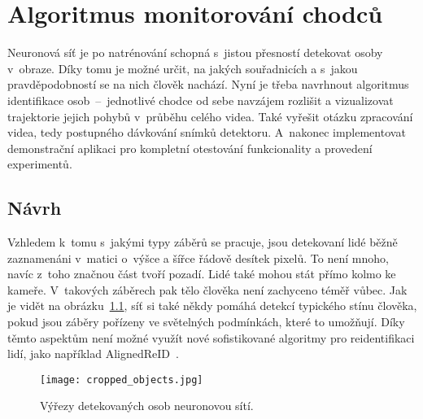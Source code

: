 
\chapter{Algoritmus monitorování chodců}
\label{chap_5}

Neuronová síť je po natrénování schopná s~jistou přesností detekovat osoby v~obraze. Díky tomu je možné určit, na jakých souřadnicích a s~jakou pravděpodobností se na nich člověk nachází. Nyní je třeba navrhnout algoritmus identifikace osob~--~jednotlivé chodce od sebe navzájem rozlišit a vizualizovat trajektorie jejich pohybů v~průběhu celého videa. Také vyřešit otázku zpracování videa, tedy postupného dávkování snímků detektoru. A~nakonec implementovat demonstrační aplikaci pro kompletní otestování funkcionality a provedení experimentů.


\section{Návrh}

Vzhledem k~tomu s~jakými typy záběrů se pracuje, jsou detekovaní lidé běžně zaznamenáni v~matici o~výšce a šířce řádově desítek pixelů. To není mnoho, navíc z~toho značnou část tvoří pozadí. Lidé také mohou stát přímo kolmo ke kameře. V~takových záběrech pak tělo člověka není zachyceno téměř vůbec. Jak je vidět na obrázku~\ref{fig_obj_examples}, síť si také někdy pomáhá detekcí typického stínu člověka, pokud jsou záběry pořízeny ve světelných podmínkách, které to umožňují. Díky těmto aspektům není možné využít nové sofistikované algoritmy pro reidentifikaci lidí, jako například AlignedReID~\cite{paperAlignedReId}.

\begin{figure}[H]
    \centering
    \texttt{[image: cropped\_objects.jpg]}
    \caption[Výřezy detekovaných osob neuronovou sítí]{Výřezy detekovaných osob neuronovou sítí.}
    \label{fig_obj_examples}
\end{figure}

